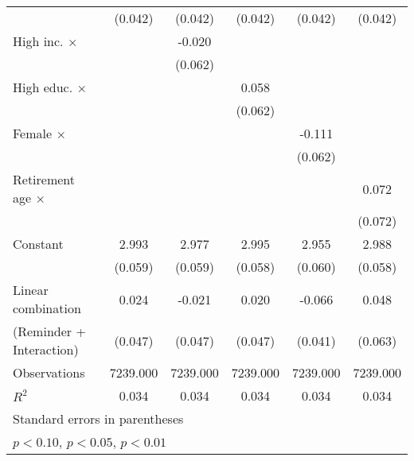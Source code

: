 {\begin{tabular}{l*{5}{c}}
                    &     (0.042)         &     (0.042)         &     (0.042)         &     (0.042)         &     (0.042)         \\
\addlinespace
High inc. $\times$  &                     &      -0.020         &                     &                     &                     \\
                    &                     &     (0.062)         &                     &                     &                     \\
\addlinespace
High educ. $\times$ &                     &                     &       0.058         &                     &                     \\
                    &                     &                     &     (0.062)         &                     &                     \\
\addlinespace
Female $\times$     &                     &                     &                     &      -0.111\sym{*}  &                     \\
                    &                     &                     &                     &     (0.062)         &                     \\
\addlinespace
Retirement age $\times$&                     &                     &                     &                     &       0.072         \\
                    &                     &                     &                     &                     &     (0.072)         \\
\addlinespace
Constant            &       2.993\sym{***}&       2.977\sym{***}&       2.995\sym{***}&       2.955\sym{***}&       2.988\sym{***}\\
                    &     (0.059)         &     (0.059)         &     (0.058)         &     (0.060)         &     (0.058)         \\
\midrule
Linear combination  &       0.024         &      -0.021         &       0.020         &      -0.066         &       0.048         \\
(Reminder + Interaction)&     (0.047)         &     (0.047)         &     (0.047)         &     (0.041)         &     (0.063)         \\
Observations        &    7239.000         &    7239.000         &    7239.000         &    7239.000         &    7239.000         \\
\(R^{2}\)           &       0.034         &       0.034         &       0.034         &       0.034         &       0.034         \\
\bottomrule
\multicolumn{6}{l}{\footnotesize Standard errors in parentheses}\\
\multicolumn{6}{l}{\footnotesize \sym{*} \(p<0.10\), \sym{**} \(p<0.05\), \sym{***} \(p<0.01\)}\\
\end{tabular}
}
